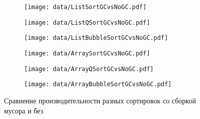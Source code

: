 \begin{figure}[H]
	\centering
	\begin{subfigure}[b]{0.40\textwidth}
       \centering
	   \texttt{[image: data/ListSortGCvsNoGC.pdf]}
	   \label{fig:list.sortGCvsNoGC}
	\end{subfigure}
	\begin{subfigure}[b]{0.40\textwidth}
       \centering
	   \texttt{[image: data/ListQSortGCvsNoGC.pdf]}
	   \label{fig:list.qsortGCvsNoGC}
	\end{subfigure}
	\begin{subfigure}[b]{0.40\textwidth}
       \centering
	   \texttt{[image: data/ListBubbleSortGCvsNoGC.pdf]}
	   \label{fig:list.bsortGCvsNoGC}
	\end{subfigure}
	\begin{subfigure}[b]{0.40\textwidth}
       \centering
	   \texttt{[image: data/ArraySortGCvsNoGC.pdf]}
	   \label{fig:Array.sortGCvsNoGC}
	\end{subfigure}
	\begin{subfigure}[b]{0.40\textwidth}
       \centering
	   \texttt{[image: data/ArrayQSortGCvsNoGC.pdf]}
	   \label{fig:Array.qsortGCvsNoGC}
	\end{subfigure}
	\begin{subfigure}[b]{0.40\textwidth}
       \centering
	   \texttt{[image: data/ArrayBubbleSortGCvsNoGC.pdf]}
	   \label{fig:Array.bsortGCvsNoGC}
	\end{subfigure}
	\caption{Сравнение производительности разных сортировок со сборкой мусора и без}
	\label{fig:GCvsNoGC}
\end{figure}

